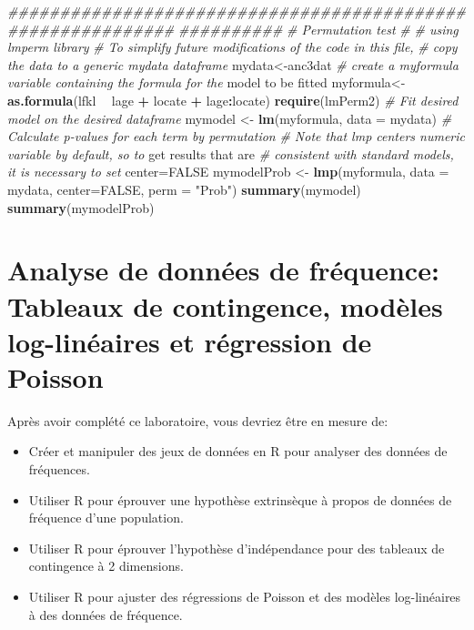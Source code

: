 \documentclass[12pt,]{book}
\newenvironment{Shaded}{\begin{snugshade}}{\end{snugshade}}
\newcommand{\CommentTok}[1]{\textcolor[rgb]{0.56,0.35,0.01}{\textit{#1}}}
\newcommand{\DataTypeTok}[1]{\textcolor[rgb]{0.13,0.29,0.53}{#1}}
\newcommand{\KeywordTok}[1]{\textcolor[rgb]{0.13,0.29,0.53}{\textbf{#1}}}
\newcommand{\NormalTok}[1]{#1}
\newcommand{\OperatorTok}[1]{\textcolor[rgb]{0.81,0.36,0.00}{\textbf{#1}}}
\newcommand{\OtherTok}[1]{\textcolor[rgb]{0.56,0.35,0.01}{#1}}
\newcommand{\StringTok}[1]{\textcolor[rgb]{0.31,0.60,0.02}{#1}}
\providecommand{\tightlist}{%
  \setlength{\itemsep}{0pt}\setlength{\parskip}{0pt}}
\begin{document}
\begin{Shaded}
\begin{Highlighting}[]
\CommentTok{############################################################}
\CommentTok{##########}
\CommentTok{# Permutation test}
\CommentTok{#}
\CommentTok{# using lmperm library}
\CommentTok{# To simplify future modifications of the code in this file,}
\CommentTok{# copy the data to a generic mydata dataframe}
\NormalTok{mydata<-anc3dat}
\CommentTok{# create a myformula variable containing the formula for the}
\NormalTok{model to be fitted}
\NormalTok{myformula<-}\KeywordTok{as.formula}\NormalTok{(lfkl }\OperatorTok{~}\StringTok{ }\NormalTok{lage }\OperatorTok{+}\StringTok{ }\NormalTok{locate }\OperatorTok{+}\StringTok{ }\NormalTok{lage}\OperatorTok{:}\NormalTok{locate)}
\KeywordTok{require}\NormalTok{(lmPerm2)}
\CommentTok{# Fit desired model on the desired dataframe}
\NormalTok{mymodel <-}\StringTok{ }\KeywordTok{lm}\NormalTok{(myformula, }\DataTypeTok{data =}\NormalTok{ mydata)}
\CommentTok{# Calculate p-values for each term by permutation}
\CommentTok{# Note that lmp centers numeric variable by default, so to}
\NormalTok{get results that are}
\CommentTok{# consistent with standard models, it is necessary to set}
\NormalTok{center=}\OtherTok{FALSE}
\NormalTok{mymodelProb <-}\StringTok{ }\KeywordTok{lmp}\NormalTok{(myformula, }\DataTypeTok{data =}\NormalTok{ mydata, }\DataTypeTok{center=}\OtherTok{FALSE}\NormalTok{,}
\DataTypeTok{perm =} \StringTok{"Prob"}\NormalTok{)}
\KeywordTok{summary}\NormalTok{(mymodel)}
\KeywordTok{summary}\NormalTok{(mymodelProb)}
\end{Highlighting}
\end{Shaded}

\hypertarget{analyse-de-donnuxe9es-de-fruxe9quence-tableaux-de-contingence-moduxe8les-log-linuxe9aires-et-ruxe9gression-de-poisson}{%
\chapter{Analyse de données de fréquence: Tableaux de contingence, modèles log-linéaires et régression de Poisson}\label{analyse-de-donnuxe9es-de-fruxe9quence-tableaux-de-contingence-moduxe8les-log-linuxe9aires-et-ruxe9gression-de-poisson}}

Après avoir complété ce laboratoire, vous devriez être en mesure de:

\begin{itemize}
\tightlist
\item
  Créer et manipuler des jeux de données en R pour analyser des données de fréquences.
\item
  Utiliser R pour éprouver une hypothèse extrinsèque à propos de données de fréquence d'une population.
\item
  Utiliser R pour éprouver l'hypothèse d'indépendance pour des tableaux de contingence à 2 dimensions.
\item
  Utiliser R pour ajuster des régressions de Poisson et des modèles log-linéaires à des données de fréquence.
\end{itemize}
\end{document}
